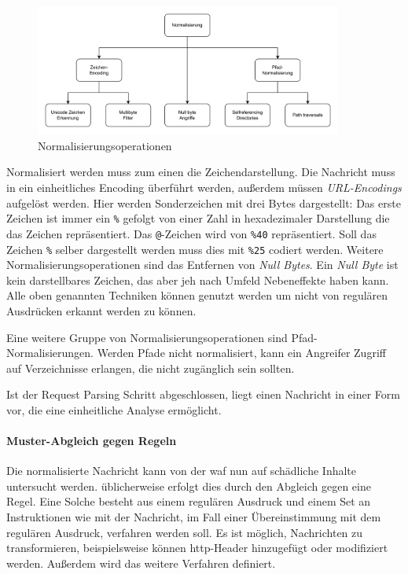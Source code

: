 \begin{figure}[!hbt]
    \centering
    \includegraphics[width=0.9\textwidth]{./images/Normalisierung.png}
    \caption{Normalisierungsoperationen}
    \label{fig:norming}
\end{figure}

Normalisiert werden muss zum einen die Zeichendarstellung.
Die Nachricht muss in ein einheitliches Encoding überführt werden, außerdem müssen \textit{URL-Encodings} aufgelöst werden.
Hier werden Sonderzeichen mit drei Bytes dargestellt:
Das erste Zeichen ist immer ein \verb|%| gefolgt von einer Zahl in hexadezimaler Darstellung die das Zeichen repräsentiert.
Das \verb|@|-Zeichen wird von \verb|%40| repräsentiert.
Soll das Zeichen \verb|%| selber dargestellt werden muss dies mit \verb|%25| codiert werden.
Weitere Normalisierungsoperationen sind das Entfernen von \textit{Null Bytes}.
Ein \textit{Null Byte} ist kein darstellbares Zeichen, das aber jeh nach Umfeld Nebeneffekte haben kann.
Alle oben genannten Techniken können genutzt werden um nicht von regulären Ausdrücken erkannt werden zu können.

Eine weitere Gruppe von Normalisierungsoperationen sind Pfad-Normalisierungen.
Werden Pfade nicht normalisiert, kann ein Angreifer Zugriff auf Verzeichnisse erlangen, die nicht zugänglich sein sollten.

Ist der Request Parsing Schritt abgeschlossen, liegt einen Nachricht in einer Form vor, die eine einheitliche Analyse ermöglicht.

\paragraph{Muster-Abgleich gegen Regeln}
Die normalisierte Nachricht kann von der \ac{waf} nun auf schädliche Inhalte untersucht werden.
üblicherweise erfolgt dies durch den Abgleich gegen eine Regel.
Eine Solche besteht aus einem regulären Ausdruck und einem Set an Instruktionen wie mit der Nachricht, im Fall einer Übereinstimmung mit dem regulären Ausdruck, verfahren werden soll.
Es ist möglich, Nachrichten zu transformieren, beispielsweise können \ac{http}-Header hinzugefügt oder modifiziert werden.
Außerdem wird das weitere Verfahren definiert.

